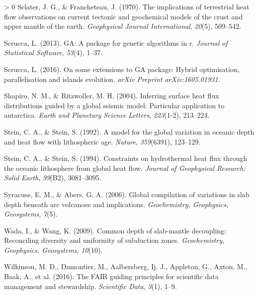 \documentclass[draft,linenumbers]{agujournal2018}
\newlength{\cslhangindent}
\newenvironment{CSLReferences}[3] %
 {%
  \setlength{\parindent}{0pt}
  \ifodd #1 \everypar{\setlength{\hangindent}{\cslhangindent}}\ignorespaces\fi
  \ifnum #2 > 0
  \setlength{\parskip}{#2\baselineskip}
  \fi
 }%
 {}
\begin{document}
\begin{CSLReferences}{1}{0}
\leavevmode\hypertarget{ref-sclater1970}{}%
Sclater, J. G., \& Francheteau, J. (1970). The implications of
terrestrial heat flow observations on current tectonic and geochemical
models of the crust and upper mantle of the earth. \emph{Geophysical
Journal International}, \emph{20}(5), 509--542.

\leavevmode\hypertarget{ref-scrucca2013}{}%
Scrucca, L. (2013). GA: A package for genetic algorithms in r.
\emph{Journal of Statistical Software}, \emph{53}(4), 1--37.

\leavevmode\hypertarget{ref-scrucca2016}{}%
Scrucca, L. (2016). On some extensions to GA package: Hybrid
optimisation, parallelisation and islands evolution. \emph{arXiv
Preprint arXiv:1605.01931}.

\leavevmode\hypertarget{ref-shapiro2004}{}%
Shapiro, N. M., \& Ritzwoller, M. H. (2004). Inferring surface heat flux
distributions guided by a global seismic model: Particular application
to antarctica. \emph{Earth and Planetary Science Letters},
\emph{223}(1-2), 213--224.

\leavevmode\hypertarget{ref-stein1992}{}%
Stein, C. A., \& Stein, S. (1992). A model for the global variation in
oceanic depth and heat flow with lithospheric age. \emph{Nature},
\emph{359}(6391), 123--129.

\leavevmode\hypertarget{ref-stein1994}{}%
Stein, C. A., \& Stein, S. (1994). Constraints on hydrothermal heat flux
through the oceanic lithosphere from global heat flow. \emph{Journal of
Geophysical Research: Solid Earth}, \emph{99}(B2), 3081--3095.

\leavevmode\hypertarget{ref-syracuse2006}{}%
Syracuse, E. M., \& Abers, G. A. (2006). Global compilation of
variations in slab depth beneath arc volcanoes and implications.
\emph{Geochemistry, Geophysics, Geosystems}, \emph{7}(5).

\leavevmode\hypertarget{ref-wada2009}{}%
Wada, I., \& Wang, K. (2009). Common depth of slab-mantle decoupling:
Reconciling diversity and uniformity of subduction zones.
\emph{Geochemistry, Geophysics, Geosystems}, \emph{10}(10).

\leavevmode\hypertarget{ref-wilkinson2016}{}%
Wilkinson, M. D., Dumontier, M., Aalbersberg, Ij. J., Appleton, G.,
Axton, M., Baak, A., et al. (2016). The FAIR guiding principles for
scientific data management and stewardship. \emph{Scientific Data},
\emph{3}(1), 1--9.

\end{CSLReferences}


\end{document}
